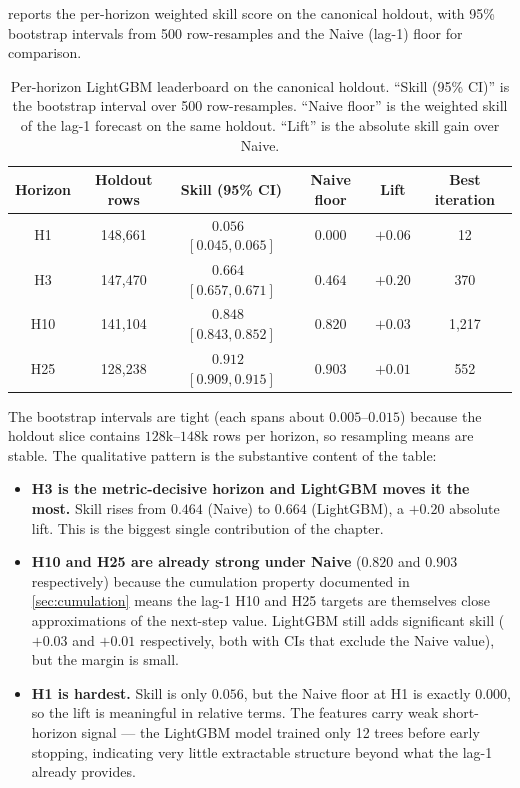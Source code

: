  reports the per-horizon weighted skill score on the canonical holdout, with 95\% bootstrap intervals from 500 row-resamples and the Naive (lag-1) floor for comparison.

\begin{table}[h]
\centering
\caption{Per-horizon LightGBM leaderboard on the canonical holdout. ``Skill (95\% CI)'' is the bootstrap interval over 500 row-resamples. ``Naive floor'' is the weighted skill of the lag-1 forecast on the same holdout. ``Lift'' is the absolute skill gain over Naive.}
\label{tab:lgbm_leaderboard}
\begin{tabular}{c c c c c c}
\toprule
Horizon & Holdout rows & Skill (95\% CI) & Naive floor & Lift & Best iteration \\
\midrule
H1  & 148{,}661 & $0.056$ \,$[0.045, 0.065]$  & $0.000$ & $+0.06$ &    12 \\
H3  & 147{,}470 & $\mathbf{0.664}$ \,$[\mathbf{0.657}, \mathbf{0.671}]$  & $0.464$ & $\mathbf{+0.20}$ &   370 \\
H10 & 141{,}104 & $0.848$ \,$[0.843, 0.852]$  & $0.820$ & $+0.03$ & 1{,}217 \\
H25 & 128{,}238 & $0.912$ \,$[0.909, 0.915]$  & $0.903$ & $+0.01$ &   552 \\
\bottomrule
\end{tabular}
\end{table}

The bootstrap intervals are tight (each spans about $0.005$--$0.015$) because the holdout slice contains $128$k--$148$k rows per horizon, so resampling means are stable. The qualitative pattern is the substantive content of the table:

\begin{itemize}
  \item \textbf{H3 is the metric-decisive horizon and LightGBM moves it the most.} Skill rises from $0.464$ (Naive) to $\mathbf{0.664}$ (LightGBM), a $+0.20$ absolute lift. This is the biggest single contribution of the chapter.
  \item \textbf{H10 and H25 are already strong under Naive} ($0.820$ and $0.903$ respectively) because the cumulation property documented in \cref{sec:cumulation} means the lag-1 H10 and H25 targets are themselves close approximations of the next-step value. LightGBM still adds significant skill ($+0.03$ and $+0.01$ respectively, both with CIs that exclude the Naive value), but the margin is small.
  \item \textbf{H1 is hardest.} Skill is only $0.056$, but the Naive floor at H1 is exactly $0.000$, so the lift is meaningful in relative terms. The features carry weak short-horizon signal --- the LightGBM model trained only 12 trees before early stopping, indicating very little extractable structure beyond what the lag-1 already provides.
\end{itemize}


